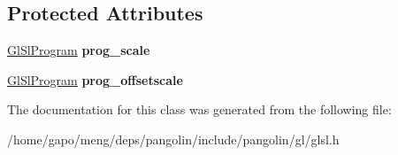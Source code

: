 \subsection*{Protected Attributes}
\begin{DoxyCompactItemize}
\item 
\hyperlink{classpangolin_1_1_gl_sl_program}{Gl\+Sl\+Program} {\bfseries prog\+\_\+scale}\hypertarget{classpangolin_1_1_gl_sl_utilities_a1d740b28056c07082b64c5d6a6c07bc0}{}\label{classpangolin_1_1_gl_sl_utilities_a1d740b28056c07082b64c5d6a6c07bc0}

\item 
\hyperlink{classpangolin_1_1_gl_sl_program}{Gl\+Sl\+Program} {\bfseries prog\+\_\+offsetscale}\hypertarget{classpangolin_1_1_gl_sl_utilities_a537c701c772160cbfb2c1e642b5af395}{}\label{classpangolin_1_1_gl_sl_utilities_a537c701c772160cbfb2c1e642b5af395}

\end{DoxyCompactItemize}


The documentation for this class was generated from the following file\+:\begin{DoxyCompactItemize}
\item 
/home/gapo/meng/deps/pangolin/include/pangolin/gl/glsl.\+h\end{DoxyCompactItemize}
